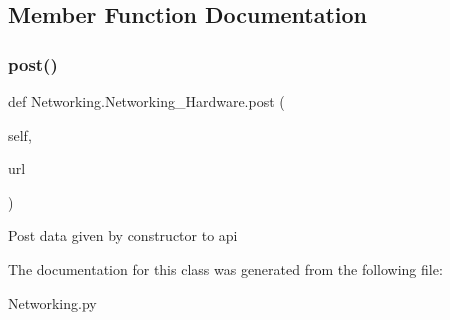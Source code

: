 \subsection{Member Function Documentation}
\mbox{\label{classNetworking_1_1Networking__Hardware_abf6c684c8234f0554adf0d615d2b796a}} 
\subsubsection{\texorpdfstring{post()}{post()}}
{\footnotesize\ttfamily def Networking.\+Networking\+\_\+\+Hardware.\+post (\begin{DoxyParamCaption}\item[{}]{self,  }\item[{}]{url }\end{DoxyParamCaption})}

\begin{DoxyVerb}Post data given by constructor to api \end{DoxyVerb}
 

The documentation for this class was generated from the following file\+:\begin{DoxyCompactItemize}
\item 
Networking.\+py\end{DoxyCompactItemize}
